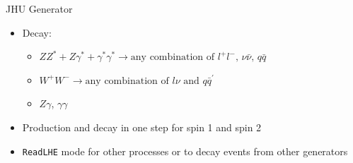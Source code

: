 \documentclass[usenames,dvipsnames,svgnames,table]{beamer}
\newcommand{\spin}[1]{\text{spin }#1}
\begin{document}
\begin{frame}{JHU Generator}
\begin{itemize}
\item Decay:
\begin{itemize}[label={$\to$}] \small
\item \(ZZ^*+Z\gamma^*+\gamma^*\gamma^*\to \text{any combination of $l^+l^-$, $\nu\bar{\nu}$, $q\bar{q}$}\)
\item \(W^+W^-\to \text{any combination of $l\nu$ and $q\bar{q}^\prime$}\)
\item $Z\gamma$, $\gamma\gamma$
\end{itemize}
\item Production and decay in one step for spin 1 and spin 2
\item \texttt{ReadLHE} mode for other processes or to decay events from other generators
\end{itemize}
\end{frame}
\end{document}
